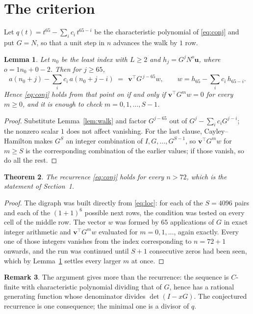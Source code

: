 \documentclass[11pt,a4paper]{article}
\theoremstyle{plain}
\newtheorem{theorem}{Theorem}
\newtheorem{lemma}[theorem]{Lemma}
\theoremstyle{definition}
\newtheorem{remark}[theorem]{Remark}
\begin{document}
\section{The criterion}

Let $q(t)=t^{65}-\sum_i c_i\,t^{65-i}$ be the characteristic polynomial of
\eqref{eq:conj} and put $G=N$, so that a unit step in $n$ advances the walk by
$1$ row.

\begin{lemma}\label{lem:crit}
Let $n_0$ be the least index with $L\ge2$ and $h_j=G^{j}N^{o}\mathbf{u}$, where
$o=1n_0+0-2$. Then for $j\ge65$,
\[
a(n_0+j)-\sum_i c_i\,a(n_0+j-i)\;=\;\,\mathbf{v}^{\!\top}G^{\,j-65}w,
\qquad w=h_{65}-\sum_i c_i\,h_{65-i} .
\]
Hence \eqref{eq:conj} holds from that point on if and only if
$\mathbf{v}^{\!\top}G^{m}w=0$ for every $m\ge0$, and it is enough to check
$m=0,1,\dots,S-1$.
\end{lemma}

\begin{proof}
Substitute Lemma~\ref{lem:walk} and factor $G^{j-65}$ out of
$G^{j}-\sum_ic_iG^{j-i}$; the nonzero scalar $1$ does not affect
vanishing. For the last clause, Cayley--Hamilton makes $G^{S}$ an integer combination of
$I,G,\dots,G^{S-1}$, so $\mathbf{v}^{\!\top}G^{m}w$ for $m\ge S$ is the corresponding
combination of the earlier values; if those vanish, so do all the rest.
\end{proof}

\begin{theorem}
The recurrence \eqref{eq:conj} holds for every $n>72$, which is the statement of
Section~1.
\end{theorem}

\begin{proof}
The digraph was built directly from \eqref{eq:loc}: for each of the $S=4096$ pairs and each
of the $(1+1)^{6}$ possible next rows, the condition was tested on every cell of
the middle row. The vector $w$ was formed by $65$ applications of $G$ in exact integer
arithmetic and $\mathbf{v}^{\!\top}G^{m}w$ evaluated for $m=0,1,\dots$, again exactly.
Every one of those integers vanishes from the index corresponding to $n=72+1$ onwards,
and the run was continued until $S+1$ consecutive zeros had been seen, which by
Lemma~\ref{lem:crit} settles every larger $m$ at once.
\end{proof}

\begin{remark}
The argument gives more than the recurrence: the sequence is $C$-finite with characteristic
polynomial dividing that of $G$, hence has a rational generating function whose denominator
divides $\det(I-xG)$. The conjectured recurrence is one consequence; the minimal one is a
divisor of $q$.
\end{remark}
\end{document}
